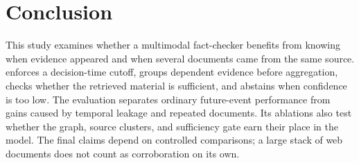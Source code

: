 \section{Conclusion}

This study examines whether a multimodal fact-checker benefits from knowing when evidence appeared and when several documents came from the same source. \systemname{} enforces a decision-time cutoff, groups dependent evidence before aggregation, checks whether the retrieved material is sufficient, and abstains when confidence is too low. The evaluation separates ordinary future-event performance from gains caused by temporal leakage and repeated documents. Its ablations also test whether the graph, source clusters, and sufficiency gate earn their place in the model. The final claims depend on controlled comparisons; a large stack of web documents does not count as corroboration on its own.


